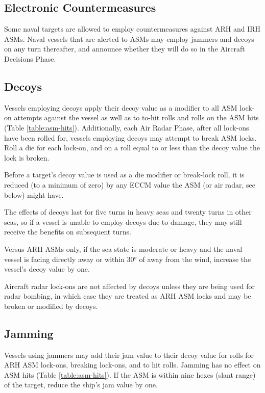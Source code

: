 \subsection{Electronic Countermeasures}  Some naval targets are allowed to employ countermeasures against ARH and IRH ASMs.  Naval vessels that are alerted to ASMs may employ jammers and decoys on any turn thereafter, and announce whether they will do so in the Aircraft Decisions Phase.

\subsection{Decoys} \label{rule:asm-decoys} Vessels employing decoys apply their decoy value as a modifier to all ASM lock-on attempts against the vessel as well as to to-hit rolls and rolls on the ASM hits (Table \ref{table:asm-hits}).  Additionally, each Air Radar Phase, after all lock-ons have been rolled for, vessels employing decoys may attempt to break ASM locks.   Roll a die for each lock-on, and on a roll equal to or less than the decoy value the lock is broken.

Before a target's decoy value is used as a die modifier or break-lock roll, it is reduced (to a minimum of zero) by any ECCM value the ASM (or air radar, see below) might have.

The effects of decoys last for five turns in heavy seas and twenty turns in other seas, so if a vessel is unable to employ decoys due to damage, they may still receive the benefits on subsequent turns.

Versus ARH ASMs only, if the sea state is moderate or heavy and the naval vessel is facing directly away or within 30° of away from the wind, increase the vessel's decoy value by one.

Aircraft radar lock-ons are not affected by decoys unless they are being used for radar bombing, in which case they are treated as ARH ASM locks and may be broken or modified by decoys.

\subsection{Jamming}  Vessels using jammers may add their jam value to their decoy value for rolls for ARH ASM lock-ons, breaking lock-ons, and to hit rolls. Jamming has no effect on ASM hits (Table \ref{table:asm-hits}). If the ASM is within nine hexes (slant range) of the target, reduce the ship's jam value by one.

